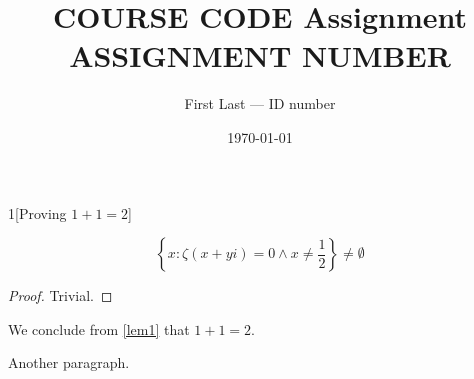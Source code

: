 \documentclass[a4paper,12pt]{article}
\begin{document}
\author{First Last --- ID number}
\title{COURSE CODE Assignment ASSIGNMENT NUMBER}
\date{\today}
\maketitle
\newpage

\begin{question}{1}[Proving $1+1=2$]
	
	\begin{lem}
		\begin{equation*}
			\left\{x  : \zeta(x+yi) =0 \wedge x \neq \frac{1}{2}\right\} \neq \emptyset
		\end{equation*}\label{lem1}
	\end{lem}
	
	\begin{proof}
		Trivial.
	\end{proof}

	We conclude from \cref{lem1} that $1+1=2$.
	
	Another paragraph.
	
\end{question}
\end{document}
